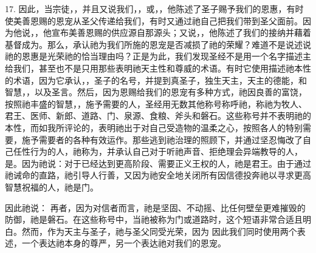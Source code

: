 \par

17. 因此，当宗徒，，并且又说我们，，或，，他陈述了圣子赐予我们的恩惠，有时使美善恩赐的恩宠从圣父传递给我们，有时又通过祂自己把我们带到圣父面前。因为他说，，他宣布美善恩赐的供应源自那源头；又说，，他陈述了我们的接纳并藉着基督成为。那么，承认祂为我们所施的恩宠是否减损了祂的荣耀？难道不是说述说祂的恩惠是光荣祂的恰当理由吗？正是为此，我们发现圣经不是用一个名字描述主给我们，甚至也不是只用那些表明祂天主性和尊威的术语。有时它使用描述祂本性的术语，因为它承认，，圣子的名号，并提到真圣子，独生天主，天主的德能，和智慧，，以及圣言。然后，因为恩赐给我们的恩宠有多种方式，祂因良善的富饶，按照祂丰盛的智慧，，施予需要的人，圣经用无数其他称号称呼祂，称祂为牧人、君王、医师、新郎、道路、门、泉源、食粮、斧头和磐石。这些称号并不表明祂的本性，而如我所评论的，表明祂出于对自己受造物的温柔之心，按照各人的特别需要，施予需要者的各种有效运作。那些逃到祂治理的照顾下，并通过坚忍悔改了自己任性行为的人，祂称为，并承认自己对于听祂声音、拒绝理会异端教导的人，是。因为祂说：对于已经达到更高阶段、需要正义王权的人，祂是君王。由于通过祂诫命的直路，祂引导人行善，又因为祂安全地关闭所有因信德投奔祂以寻求更高智慧祝福的人，祂是门。\par

因此祂说： 再者，因为对信者而言，祂是坚固、不动摇、比任何壁垒更难摧毁的防御，祂是磐石。在这些称号中，当祂被称为门或道路时，这个短语非常合适且明白。然而，作为天主与圣子，祂与圣父同受光荣，因为 因此我们同时使用两个表述，一个表达祂本身的尊严，另一个表达祂对我们的恩宠。\par

